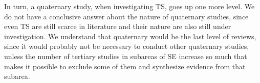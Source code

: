 \documentclass[sigconf]{acmart}
\begin{document}
In turn, a quaternary study, when investigating TS, goes up one more level. We do not have a conclusive answer about the nature of quaternary studies, since even TS are still scarce in literature and their nature are also still under investigation. We understand that quaternary would be the last level of reviews, since it would probably not be necessary to conduct other quaternary studies, unless the number of tertiary studies in subareas of SE increase so much that makes it possible to exclude some of them and synthesize evidence from that subarea.

\end{document}
